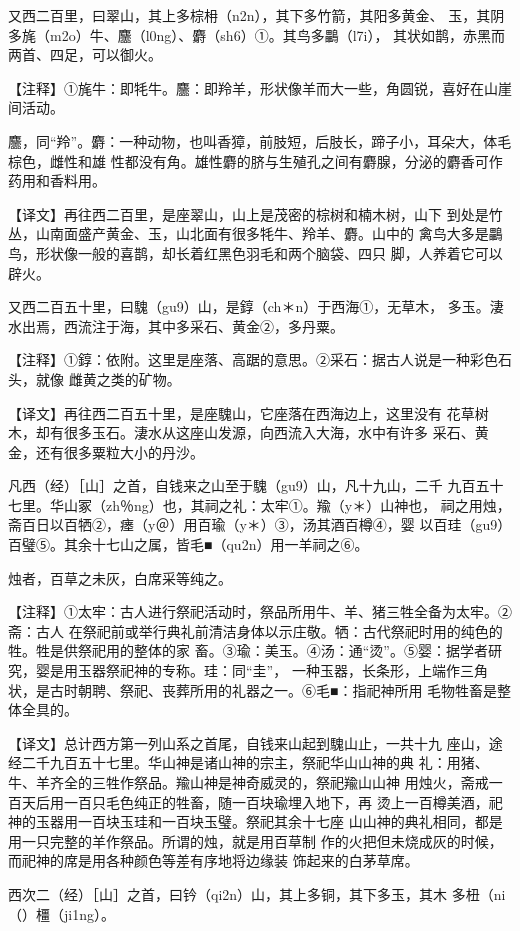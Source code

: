 \documentclass[a4paper,12pt,UTF8,twoside]{ctexbook}
\begin{document}
又西二百里，曰翠山，其上多棕枏（n2n），其下多竹箭，其阳多黄金、 玉，其阴多旄（m2o）牛、麢（l0ng）、麝（sh6）①。其鸟多鸓（l7i）， 其状如鹊，赤黑而两首、四足，可以御火。

【注释】①旄牛：即牦牛。麢：即羚羊，形状像羊而大一些，角圆锐，喜好在山崖间活动。

麢，同“羚”。麝：一种动物，也叫香獐，前肢短，后肢长，蹄子小，耳朵大，体毛棕色，雌性和雄 性都没有角。雄性麝的脐与生殖孔之间有麝腺，分泌的麝香可作药用和香料用。

【译文】再往西二百里，是座翠山，山上是茂密的棕树和楠木树，山下 到处是竹丛，山南面盛产黄金、玉，山北面有很多牦牛、羚羊、麝。山中的 禽鸟大多是鸓鸟，形状像一般的喜鹊，却长着红黑色羽毛和两个脑袋、四只 脚，人养着它可以辟火。

又西二百五十里，曰騩（gu9）山，是錞（ch＊n）于西海①，无草木， 多玉。淒水出焉，西流注于海，其中多采石、黄金②，多丹粟。

【注释】①錞：依附。这里是座落、高踞的意思。②采石：据古人说是一种彩色石头，就像 雌黄之类的矿物。

【译文】再往西二百五十里，是座騩山，它座落在西海边上，这里没有 花草树木，却有很多玉石。淒水从这座山发源，向西流入大海，水中有许多 采石、黄金，还有很多粟粒大小的丹沙。

凡西（经）［山］之首，自钱来之山至于騩（gu9）山，凡十九山，二千 九百五十七里。华山冢（zh％ng）也，其祠之礼：太牢①。羭（y＊）山神也， 祠之用烛，斋百日以百牺②，瘗（y＠）用百瑜（y＊）③，汤其酒百樽④，婴 以百珪（gu9）百璧⑤。其余十七山之属，皆毛■（qu2n）用一羊祠之⑥。

烛者，百草之未灰，白席采等纯之。

【注释】①太牢：古人进行祭祀活动时，祭品所用牛、羊、猪三牲全备为太牢。②斋：古人 在祭祀前或举行典礼前清洁身体以示庄敬。牺：古代祭祀时用的纯色的牲。牲是供祭祀用的整体的家 畜。③瑜：美玉。④汤：通“烫”。⑤婴：据学者研究，婴是用玉器祭祀神的专称。珪：同“圭”， 一种玉器，长条形，上端作三角状，是古时朝聘、祭祀、丧葬所用的礼器之一。⑥毛■：指祀神所用 毛物牲畜是整体全具的。

【译文】总计西方第一列山系之首尾，自钱来山起到騩山止，一共十九 座山，途经二千九百五十七里。华山神是诸山神的宗主，祭祀华山山神的典 礼：用猪、牛、羊齐全的三牲作祭品。羭山神是神奇威灵的，祭祀羭山山神 用烛火，斋戒一百天后用一百只毛色纯正的牲畜，随一百块瑜埋入地下，再 烫上一百樽美酒，祀神的玉器用一百块玉珪和一百块玉璧。祭祀其余十七座 山山神的典礼相同，都是用一只完整的羊作祭品。所谓的烛，就是用百草制 作的火把但未烧成灰的时候，而祀神的席是用各种颜色等差有序地将边缘装 饰起来的白茅草席。

西次二（经）［山］之首，曰钤（qi2n）山，其上多铜，其下多玉，其木 多杻（ni（）橿（ji1ng）。
\end{document}
